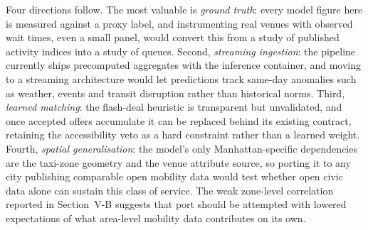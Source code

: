 \documentclass[conference]{IEEEtran}
\begin{document}
Four directions follow. The most valuable is \emph{ground truth}: every model figure here is measured against a proxy label, and instrumenting real venues with observed wait times, even a small panel, would convert this from a study of published activity indices into a study of queues. Second, \emph{streaming ingestion}: the pipeline currently ships precomputed aggregates with the inference container, and moving to a streaming architecture would let predictions track same-day anomalies such as weather, events and transit disruption rather than historical norms. Third, \emph{learned matching}: the flash-deal heuristic is transparent but unvalidated, and once accepted offers accumulate it can be replaced behind its existing contract, retaining the accessibility veto as a hard constraint rather than a learned weight. Fourth, \emph{spatial generalisation}: the model's only Manhattan-specific dependencies are the taxi-zone geometry and the venue attribute source, so porting it to any city publishing comparable open mobility data would test whether open civic data alone can sustain this class of service. The weak zone-level correlation reported in Section~V-B suggests that port should be attempted with lowered expectations of what area-level mobility data contributes on its own.
\end{document}
